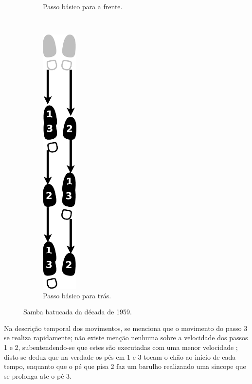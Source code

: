 \begin{itemize}
\begin{figure}[h]
\begin{subfigure}[b]{0.3\textwidth}
        \caption{Passo básico para a frente.}
        \label{fig:samba-batucada-basico-frente}
    \end{subfigure}
    ~ %
    \begin{subfigure}[b]{0.3\textwidth}
        \centering
	\includegraphics[width=0.2\textwidth]{chapters/cap-historia-sambagafieira/samba-batucada-basico-tras.eps}
        \caption{Passo básico para trás.}
        \label{fig:samba-batucada-basico-tras}
    \end{subfigure}
    \caption{Samba batucada da década de 1959.}\label{fig:samba-batucada-basico}
\end{figure}
Na descrição temporal dos movimentos, 
se menciona que o movimento  do passo 3 se realiza rapidamente;
não existe menção nenhuma sobre a velocidade dos passos 1 e 2, subentendendo-se 
que estes são executadas com uma menor velocidade \cite[pp. 58,66]{freitas1959danca};
disto se deduz que na verdade os pés em 1 e 3 tocam o chão ao inicio de cada tempo, 
enquanto que o pé que pisa 2 faz um barulho realizando uma sincope que se prolonga ate o pé 3. 



\end{itemize}
